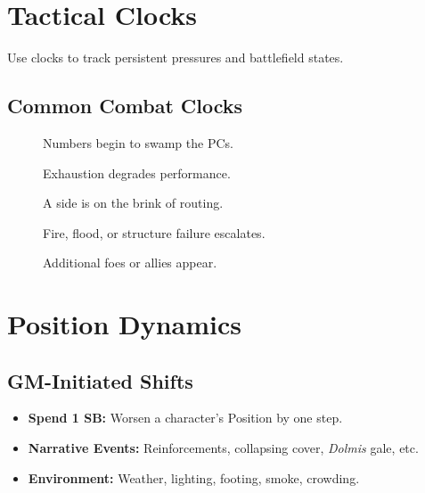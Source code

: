 \section{Tactical Clocks}
\label{sec:tactical-clocks}

Use clocks to track persistent pressures and battlefield states.

\subsection{Common Combat Clocks}
\label{subsec:combat-clocks}

\begin{description}
  \item[] Numbers begin to swamp the PCs. 
  \item[] Exhaustion degrades performance. 
  \item[] A side is on the brink of routing. 
  \item[] Fire, flood, or structure failure escalates. 
  \item[] Additional foes or allies appear. 
\end{description}

\section{Position Dynamics}
\label{sec:position-dynamics}

\subsection{GM-Initiated Shifts}
\label{subsec:gm-shifts}

\begin{itemize}
  \item \textbf{Spend 1 SB:} Worsen a character’s Position by one step. 
  \item \textbf{Narrative Events:} Reinforcements, collapsing cover, \emph{Dolmis} gale, etc.
  \item \textbf{Environment:} Weather, lighting, footing, smoke, crowding.
\end{itemize}

